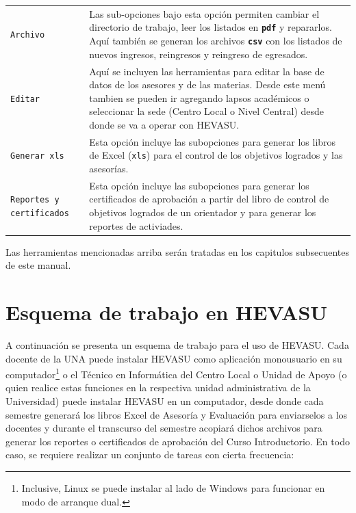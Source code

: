 \documentclass[letterpaper,12pt]{book}
\newcommand{\archivo}[1]
{\texttt{#1}}
\newcommand{\fileformat}[1]{\textbf{\texttt{#1}}}
\begin{document}
\begin{tabular}[t]{p{16ex}p{46ex}}
 \texttt{Archivo} & Las sub-opciones bajo esta opción permiten cambiar el directorio de trabajo, leer los listados en \fileformat{pdf} y repararlos. Aquí también se generan los archivos \fileformat{csv} con los listados de nuevos ingresos, reingresos y reingreso de egresados.\vspace{1ex}\\
 \texttt{Editar} & Aquí se incluyen las herramientas para editar la base de datos de los asesores y de las materias. Desde este menú tambien se pueden ir agregando lapsos académicos o seleccionar la sede (Centro Local o Nivel Central) desde donde se va a operar con HEVASU.\vspace{1ex}\\
 \texttt{Generar xls} & Esta opción incluye las subopciones para generar los libros de Excel (\archivo{xls}) para el control de los objetivos logrados y las asesorías.\vspace{1ex}\\
 \texttt{Reportes y certificados} & Esta opción incluye las subopciones para generar los certificados de aprobación a partir del libro de control de objetivos logrados de un orientador y para generar los reportes de activiades.
\end{tabular}

Las herramientas mencionadas arriba serán tratadas en los capitulos subsecuentes de este manual.

\section{Esquema de trabajo en HEVASU}

A continuación se presenta un esquema de trabajo para el uso de HEVASU. Cada docente de la UNA puede instalar HEVASU como aplicación monousuario en su computador\footnote{Inclusive, Linux se puede instalar al lado de Windows para funcionar en modo de arranque dual.} o el Técnico en Informática del Centro Local o Unidad de Apoyo (o quien realice estas funciones en la respectiva unidad administrativa de la Universidad) puede instalar HEVASU en un computador, desde donde cada semestre generará los libros Excel de Asesoría y Evaluación para enviarselos a los docentes y durante el transcurso del semestre acopiará dichos archivos para generar los reportes o certificados de aprobación del Curso Introductorio. En todo caso, se requiere realizar un conjunto de tareas con cierta frecuencia:
\end{document}
